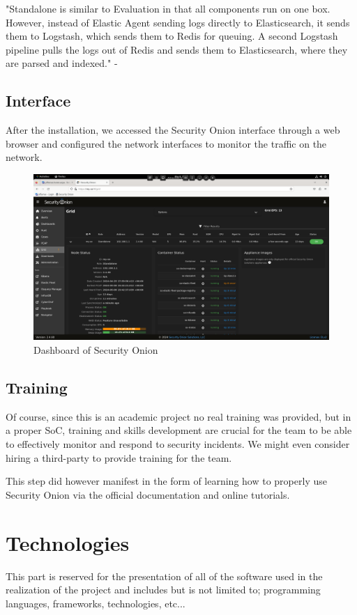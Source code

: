 "Standalone is similar to Evaluation in that all components run on one box.
However, instead of Elastic Agent sending logs directly to Elasticsearch, it sends them to Logstash, which sends them to Redis for queuing.
A second Logstash pipeline pulls the logs out of Redis and sends them to Elasticsearch, where they are parsed and indexed." - \cite{security-onion-docs}

\subsection{Interface}
After the installation, we accessed the Security Onion interface through a web browser and configured the network interfaces to monitor the traffic on the network.

\begin{figure}[H]
    \centering
    \includegraphics[width=1\textwidth]{src/assets/images/security-onion-dashboard.png}
    \caption{Dashboard of Security Onion}
\end{figure}

\subsection{Training}
Of course, since this is an academic project no real training was provided, but in a proper SoC, training and skills development are crucial for the team to be able to effectively monitor and respond to security incidents.
We might even consider hiring a third-party to provide training for the team.

This step did however manifest in the form of learning how to properly use Security Onion via the official documentation and online tutorials.

\section{Technologies}
This part is reserved for the presentation of all of the software used in the realization of the project and includes but is not limited to; programming languages, frameworks, technologies, etc...

